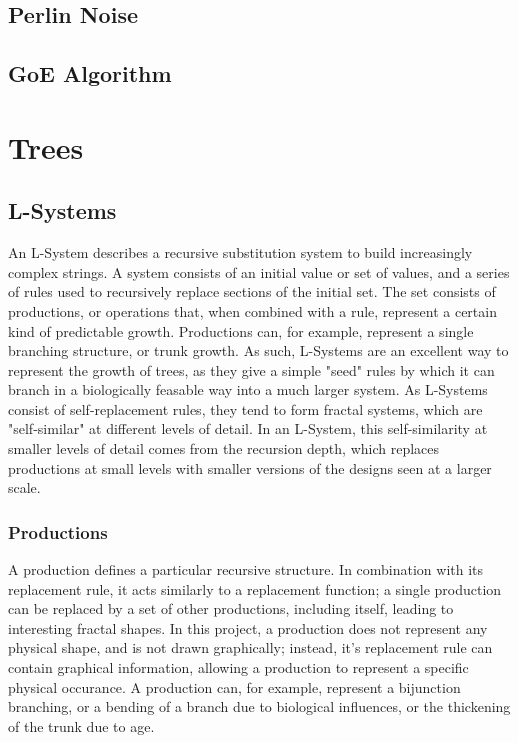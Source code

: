 \documentclass{article}
\newcommand{\tab}{\hspace*{2em}}
\begin{document}
        \subsection{Perlin Noise}

        \subsection{GoE Algorithm}

    \section{Trees}
        \subsection{L-Systems}
    \tab An L-System describes a recursive substitution system to build increasingly complex
strings. A system consists of an initial value or set of values, and a series of rules used to
recursively replace sections of the initial set. The set consists of productions, or operations
that, when combined with a rule, represent a certain kind of predictable growth. Productions can,
for example, represent a single branching structure, or trunk growth. As such, L-Systems are an
excellent way to represent the growth of trees, as they give a simple "seed" rules by which it can
branch in a biologically feasable way into a much larger system. As L-Systems consist of
self-replacement rules, they tend to form fractal systems, which are "self-similar" at different
levels of detail. In an L-System, this self-similarity at smaller levels of detail comes from the
recursion depth, which replaces productions at small levels with smaller versions of the designs
seen at a larger scale.


            \subsubsection{Productions}
    \tab A production defines a particular recursive structure. In combination with its replacement
rule, it acts similarly to a replacement function; a single production can be replaced by a set of
other productions, including itself, leading to interesting fractal shapes. In this project, a
production does not represent any physical shape, and is not drawn graphically; instead, it's 
replacement rule can contain graphical information, allowing a production to represent a specific
physical occurance. A production can, for example, represent a bijunction branching, or a bending
of a branch due to biological influences, or the thickening of the trunk due to age.
\end{document}
